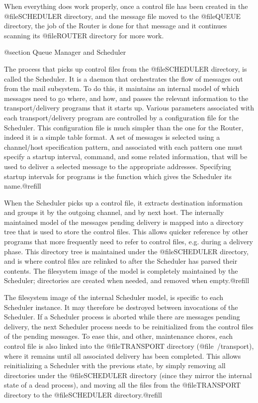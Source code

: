When everything does work properly, once a control file has been
created in the @file{SCHEDULER} directory, and the message file moved
to the @file{QUEUE} directory, the job of the Router is done for that
message and it continues scanning its @file{ROUTER} directory for more work.

@section Queue Manager and Scheduler

The process that picks up control files from the @file{SCHEDULER} directory, is
called the Scheduler. It is a daemon that orchestrates the flow of messages
out from the mail subsystem. To do this, it maintains an internal model of
which messages need to go where, and how, and passes the relevant information
to the transport/delivery programs that it starts up. Various parameters
associated with each transport/delivery program are controlled by a
configuration file for the Scheduler. This configuration file is much simpler
than the one for the Router, indeed it is a simple table format. A set of
messages is selected using a channel/host specification pattern, and
associated with each pattern one must specify a startup interval, command,
and some related information, that will be used to deliver a selected message
to the appropriate addresses. Specifying startup intervals for programs
is the function which gives the Scheduler its name.@refill

When the Scheduler picks up a control file, it extracts destination
information and groups it by the outgoing channel, and by next host.
The internally maintained model of the messages pending delivery is mapped
into a directory tree that is used to store the control files. This allows
quicker reference by other programs that more frequently need to refer to
control files, e.g. during a delivery phase. This directory tree is maintained
under the @file{SCHEDULER} directory, and is where control files are relinked
to after the Scheduler has parsed their contents. The filesystem image of the
model is completely maintained by the Scheduler; directories are created
when needed, and removed when empty.@refill

The filesystem image of the internal Scheduler model, is specific to each
Scheduler instance. It may therefore be destroyed between invocations of the
Scheduler. If a Scheduler process is aborted while there are messages pending
delivery, the next Scheduler process needs to be reinitialized from the
control files of the pending messages. To ease this, and other, maintenance
chores, each control file is also linked into the @file{TRANSPORT} directory
(@file{~/transport}), where it remains until all associated delivery has been
completed. This allows reinitializing a Scheduler with the previous state,
by simply removing all directories under the @file{SCHEDULER} directory
(since they mirror the internal state of a dead process), and moving all the
files from the @file{TRANSPORT} directory to the @file{SCHEDULER}
directory.@refill

